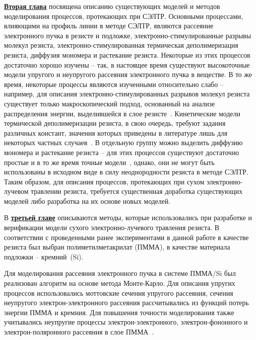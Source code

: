 \underline{\textbf{Вторая глава}} посвящена описанию существующих моделей и методов моделирования процессов, протекающих при СЭЛТР.
Основными процессами, влияющими на профиль линии в методе СЭЛТР, являются рассеяние электронного пучка в резисте и подложке, электронно-стимулированные разрывы молекул резиста, электронно-стимулированная термическая деполимеризация резиста, диффузия мономера и растекание резиста.
Некоторые из этих процессов достаточно хорошо изучены -- так, в настоящее время существуют высокоточные модели упругого и неупругого рассеяния электронного пучка в веществе.
В то же время, некоторые процессы являются изученными относительно слабо -- например, для описания электронно-стимулированных разрывов молекул резиста существует только макроскопический подход, основанный на анализе распределения энергии, выделившейся в слое резисте~\cite{Greeneich1979_Mf_Mn}.
Кинетические модели термической деполимеризации резиста, в свою очередь, требуют задания различных констант, значения которых приведены в литературе лишь для некоторых частных случаев~\cite{Boyd_3, Mita_PMMA_zip_lengths_T}.
В отдельную группу можно выделить диффузию мономера и растекание резиста -- для этих процессов существуют достаточно простые и в то же время точные модели~\cite{Fragala_3_diffusion, Leveder_2010, Kirchner_reflow}, однако, они не могут быть использованы в исходном виде в силу неоднородности резиста в методе СЭЛТР.
Таким образом, для описания процессов, протекающих при сухом электронно-лучевом травлении резиста, требуется существенная доработка существующих моделей либо разработка на их основе новых моделей.

В \underline{\textbf{третьей главе}} описываются методы, которые использовались при разработке и верификации модели сухого электронно-лучевого травления резиста.
В соответствии с проведенными ранее экспериментами в данной работе в качестве резиста был выбран полиметилметакрилат (ПММА), в качестве материала подложки -- кремний~(Si).

Для моделирования рассеяния электронного пучка в системе ПММА/Si был реализован алгоритм на основе метода Монте-Карло. Для описания упругих процессов использовались моттовские сечения упругого рассеяния, сечения неупругого электрон-электронного рассеяния рассчитывались из функций потерь энергии ПММА и кремния.
Для повышения точности моделирования также учитывались неупругие процессы электрон-электронного, электрон-фононного и электрон-поляронного рассеяния в слое ПММА~\cite{Ciappa_2010}.

